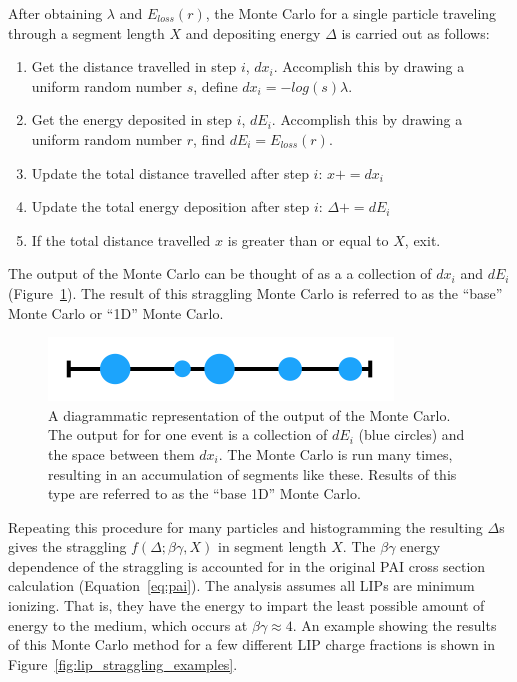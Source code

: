 After obtaining $\lambda$ and $E_{loss}(r)$, the Monte Carlo for a single particle traveling through a segment length $X$ and depositing energy $\Delta$ is carried out as follows:

\begin{enumerate}
\item Get the distance travelled in step $i$, $dx_{i}$. Accomplish this by drawing a uniform random number $s$, define $dx_{i} = -log(s) \lambda$.
\item Get the energy deposited in step $i$, $dE_{i}$. Accomplish this by drawing a uniform random number $r$, find $dE_{i} = E_{loss}(r)$.
\item Update the total distance travelled after step $i$: $x += dx_{i}$
\item Update the total energy deposition after step $i$: $\Delta += dE_{i}$
\item If the total distance travelled $x$ is greater than or equal to $X$, exit.
\end{enumerate}

The output of the Monte Carlo can be thought of as a a collection of $dx_{i}$ and $dE_{i}$ (Figure~\ref{fig:dedx_diagram}). The result of this straggling Monte Carlo is referred to as the ``base'' Monte Carlo or ``1D'' Monte Carlo. 

 \begin{figure}[htbp]
\begin{center}
\includegraphics[width=\textwidth]{figures/lips/dedx_diagram.png}
\caption{A diagrammatic representation of the output of the Monte Carlo. The output for for one event is a collection of $dE_{i}$ (blue circles) and the space between them $dx_{i}$. The Monte Carlo is run many times, resulting in an accumulation of segments like these. Results of this type are referred to as the ``base 1D'' Monte Carlo. }
\label{fig:dedx_diagram}
\end{center}
\end{figure}


Repeating this procedure for many particles and histogramming the resulting $\Delta$s gives the straggling $f(\Delta; \beta \gamma, X)$ in segment length $X$. The $\beta \gamma$ energy dependence of the straggling is accounted for in the original \ac{PAI} cross section calculation (Equation~\ref{eq:pai}). The analysis assumes all \ac{LIP}s are minimum ionizing. That is, they have the energy to impart the least possible amount of energy to the medium, which occurs at $\beta \gamma \approx 4$. An example showing the results of this Monte Carlo method for a few different \ac{LIP} charge fractions is shown in Figure~\ref{fig:lip_straggling_examples}.
 
